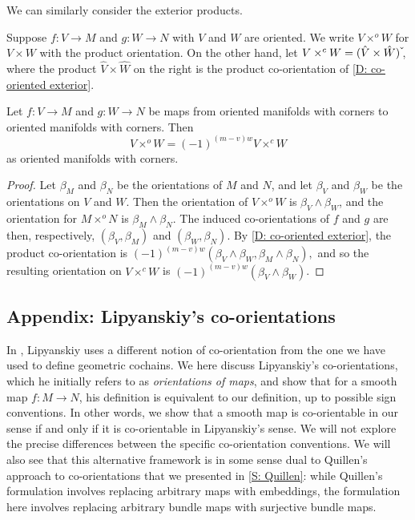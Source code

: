We can similarly consider the exterior products.

Suppose $f \colon V \to M$ and $g \colon W \to N$ with $V$ and $W$ are oriented.
We write $V \times^o W$ for $V \times W$ with the product orientation.
On the other hand, let $V \times^c W = (\hat V \times \hat W)\,\check{\vrule height1.3ex width0pt}$, where the product $\hat V \times \hat W$ on the right is the product co-orientation of \cref{D: co-oriented exterior}.

\begin{proposition}\label{P: compare exterior orientations}
	Let $f \colon V \to M$ and $g \colon W \to N$ be maps from oriented manifolds with corners to oriented manifolds with corners.
	Then $$V \times^o W = (-1)^{(m-v)w} V \times^c W$$ as oriented manifolds with corners.
\end{proposition}
\begin{proof}
	Let $\beta_M$ and $\beta_N$ be the orientations of $M$ and $N$, and let $\beta_V$ and $\beta_W$ be the orientations on $V$ and $W$.
	Then the orientation of $V \times^o W$ is $\beta_V \wedge \beta_W$, and the orientation for $M \times^o N$ is $\beta_M \wedge \beta_N$.
	The induced co-orientations of $f$ and $g$ are then, respectively, $(\beta_V, \beta_M)$ and $(\beta_W, \beta_N)$.
	By \cref{D: co-oriented exterior}, the product co-orientation is $(-1)^{(m-v)w}(\beta_V \wedge \beta_W,\beta_M \wedge \beta_N),$ and so the resulting orientation on $V \times^c W$ is $(-1)^{(m-v)w}(\beta_V \wedge \beta_W)$.
\end{proof}

\subsection{Appendix: Lipyanskiy's co-orientations}\label{S: Lipyanskiy co-orientations}

In \cite{Lipy14}, Lipyanskiy uses a different notion of co-orientation from the one we have used to define geometric cochains.
We here discuss Lipyanskiy's co-orientations, which he initially refers to as \textit{orientations of maps}, and show that for a smooth map $f \colon M \to N$, his definition is equivalent to our definition, up to possible sign conventions.
In other words, we show that a smooth map is co-orientable in our sense if and only if it is co-orientable in Lipyanskiy's sense.
We will not explore the precise differences between the specific co-orientation conventions.
We will also see that this alternative framework is in some sense dual to Quillen's approach to co-orientations that we presented in \cref{S: Quillen}: while Quillen's formulation involves replacing arbitrary maps with embeddings, the formulation here involves replacing arbitrary bundle maps with surjective bundle maps.

